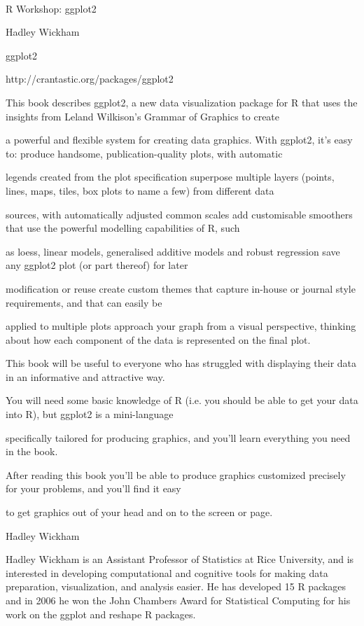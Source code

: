 


R Workshop: ggplot2

Hadley Wickham

ggplot2



http://crantastic.org/packages/ggplot2


This book describes ggplot2, a new data visualization package for R that uses the insights from Leland Wilkison's Grammar of Graphics to create 

a powerful and flexible system for creating data graphics. With ggplot2, it's easy to: produce handsome, publication-quality plots, with automatic 

legends created from the plot specification superpose multiple layers (points, lines, maps, tiles, box plots to name a few) from different data 

sources, with automatically adjusted common scales add customisable smoothers that use the powerful modelling capabilities of R, such 

as loess, linear models, generalised additive models and robust regression save any ggplot2 plot (or part thereof) for later 

modification or reuse create custom themes that capture in-house or journal style requirements, and that can easily be 

applied to multiple plots approach your graph from a visual perspective, thinking about how each component of the data is represented on the final plot. 


This book will be useful to everyone who has struggled with displaying their data in an informative and attractive way. 

You will need some basic knowledge of R (i.e. you should be able to get your data into R), but ggplot2 is a mini-language 

specifically tailored for producing graphics, and you'll learn everything you need in the book. 


After reading this book you'll be able to produce graphics customized precisely for your problems, and you'll find it easy 

to get graphics out of your head and on to the screen or page. 


Hadley Wickham


Hadley Wickham is an Assistant Professor of Statistics at Rice University,  and is interested in developing computational and cognitive tools for making data preparation, visualization, and analysis easier. He has developed 15 R packages and in 2006 he won the John Chambers Award for Statistical Computing for his work on the ggplot and reshape R packages.

